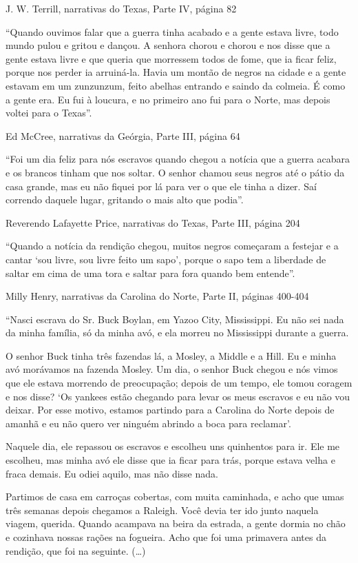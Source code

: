J. W. Terrill, narrativas do Texas, Parte IV, página 82

``Quando ouvimos falar que a guerra tinha acabado e a gente estava
livre, todo mundo pulou e gritou e dançou. A senhora chorou e chorou e
nos disse que a gente estava livre e que queria que morressem todos de
fome, que ia ficar feliz, porque nos perder ia arruiná-la. Havia um
montão de negros na cidade e a gente estavam em um zunzunzum, feito
abelhas entrando e saindo da colmeia. É como a gente era. Eu fui à
loucura, e no primeiro ano fui para o Norte, mas depois voltei para o
Texas''.

Ed McCree, narrativas da Geórgia, Parte III, página 64

``Foi um dia feliz para nós escravos quando chegou a notícia que a
guerra acabara e os brancos tinham que nos soltar. O senhor chamou seus
negros até o pátio da casa grande, mas eu não fiquei por lá para ver o
que ele tinha a dizer. Saí correndo daquele lugar, gritando o mais alto
que podia''.

Reverendo Lafayette Price, narrativas do Texas, Parte III, página 204

``Quando a notícia da rendição chegou, muitos negros começaram a
festejar e a cantar `sou livre, sou livre feito um sapo', porque o sapo
tem a liberdade de saltar em cima de uma tora e saltar para fora quando
bem entende''.

Milly Henry, narrativas da Carolina do Norte, Parte II, páginas 400-404

``Nasci escrava do Sr. Buck Boylan, em Yazoo City, Mississippi. Eu não
sei nada da minha família, só da minha avó, e ela morreu no Mississippi
durante a guerra.

O senhor Buck tinha três fazendas lá, a Mosley, a Middle e a Hill. Eu e
minha avó morávamos na fazenda Mosley. Um dia, o senhor Buck chegou e
nós vimos que ele estava morrendo de preocupação; depois de um tempo,
ele tomou coragem e nos disse? `Os yankees estão chegando para levar os
meus escravos e eu não vou deixar. Por esse motivo, estamos partindo
para a Carolina do Norte depois de amanhã e eu não quero ver ninguém
abrindo a boca para reclamar'.

Naquele dia, ele repassou os escravos e escolheu uns quinhentos para ir.
Ele me escolheu, mas minha avó ele disse que ia ficar para trás, porque
estava velha e fraca demais. Eu odiei aquilo, mas não disse nada.

Partimos de casa em carroças cobertas, com muita caminhada, e acho que
umas três semanas depois chegamos a Raleigh. Você devia ter ido junto
naquela viagem, querida. Quando acampava na beira da estrada, a gente
dormia no chão e cozinhava nossas rações na fogueira. Acho que foi uma
primavera antes da rendição, que foi na seguinte. (\ldots{})

